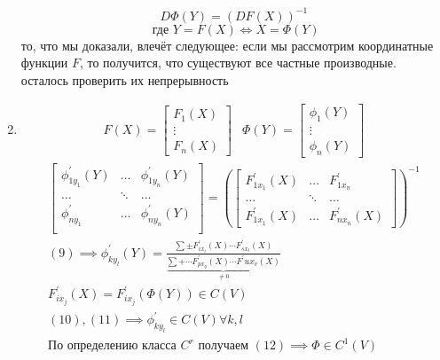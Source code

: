 \documentclass[main]{subfiles}
\begin{document}
\begin{longProof}
\begin{enumerate}
                  \[ D\Phi(Y) = (DF(X))^{-1} \tag{9} \] 
                  \[ \text{ где } Y = F(X) \Leftrightarrow X = \Phi(Y) \] 
                  то, что мы доказали, влечёт следующее: если мы рассмотрим координатные функции $F$,
                  то получится, что существуют все частные производные. осталось проверить их непрерывность
                  \item 
                  \begin{align*}
                     F(X) =
                  \begin{bmatrix*}
                     F_1(X) \\
                     \vdots \\
                     F_n(X) 
                  \end{bmatrix*} &
                  \Phi(Y) = \begin{bmatrix*}
                     \phi_1(Y) \\
                     \vdots \\
                     \phi_n(Y)                     
                  \end{bmatrix*} 
               \end{align*}
               \begin{gather*}
               \begin{bmatrix*}
                  \phi^\prime_{1y_1}(Y) & \ldots & \phi^\prime_{1y_n}(Y) \\
                  \ldots & \ddots & \ldots \\
                   \phi^\prime_{ny_1} & \ldots & \phi^\prime_{ny_n}(Y) \\
               \end{bmatrix*} =
               \left( \begin{bmatrix*}
                  F^\prime_{1x_1}(X) & \ldots & F^\prime_{1x_n} \\
                  \ldots & \ddots & \ldots \\
                  F^\prime_{1x_1}(X) & \ldots & F^\prime_{nx_n}(X)
               \end{bmatrix*} \right)^{-1} \\
               (9) \implies \phi^\prime_{ky_l}(Y) = \frac{\sum \pm F^\prime_{ix_i}(X)
               \cdots F^\prime_{sx_t}(X)}{\underbrace{\sum + \cdots F^\prime_{px_q}(X) \cdots F^\prime{ux_v}(X)}_{\ne 0}}
               \tag{10}\\
                F^\prime_{ix_j}(X) = F^\prime_{ix_j}(\Phi(Y)) \in C(V) \tag{11} \\
               (10), (11) \implies \phi^\prime_{ky_l} \in C(V) \forall k, l \tag{12} \\
               \text{По определению класса } C^r \text{ получаем } 
               (12) \implies \Phi \in C^1(V) \end{gather*}
               \end{enumerate}
        \end{longProof}
 
\end{document}
